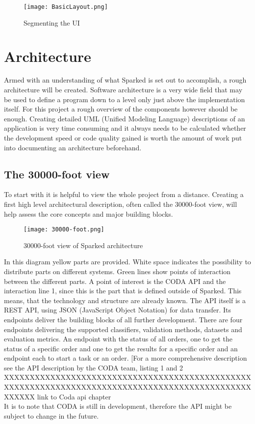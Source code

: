 \begin{figure}
	\texttt{[image: BasicLayout.png]}
	\caption{Segmenting the UI}
\end{figure} 

\section{Architecture}
Armed with an understanding of what Sparked is set out to accomplish, a rough architecture will be created. Software architecture is a very wide field that may be used to define a program down to a level only just above the implementation itself. For this project a rough overview of the components however should be enough. Creating detailed UML (Unified Modeling Language) descriptions of an application is very time consuming and it always needs to be calculated whether the development speed or code quality gained is worth the amount of work put into documenting an architecture beforehand. 

\subsection{The 30000-foot view}
To start with it is helpful to view the whole project from a distance. Creating a first high level architectural description, often called the 30000-foot view, will help assess the core concepts and major building blocks.
 
\begin{figure}
	\texttt{[image: 30000-foot.png]}
	\caption{30000-foot view of Sparked architecture }
\end{figure}

In this diagram yellow parts are provided. White space indicates the possibility to distribute parts on different systems. Green lines show points of interaction between the different parts.
A point of interest is the CODA API and the interaction line 1, since this is the part that is defined outside of Sparked. This means, that the technology and structure are already known. The API itself is a REST API, using JSON (JavaScript Object Notation) for data transfer. Its endpoints deliver the building blocks of all further development. 
There are four endpoints delivering the supported classifiers, validation methods, datasets and evaluation metrics. An endpoint with the status of all orders, one to get the status of a specific order and one to get the results for a specific order and an endpoint each to start a task or an order. [For a more comprehensive description see the API description by the CODA team, listing 1 and 2\\ XXXXXXXXXXXXXXXXXXXXXXXXXXXXXXXXXXXXXXXXXXXXXXXXXXXXXXXXXXXXXXXXXXXXXXXXXXXXXXXXXXXXXXXXXXXXXXXXXXXXXX link to Coda api chapter \\
It is to note that CODA is still in development, therefore the API might be subject to change in the future. 


